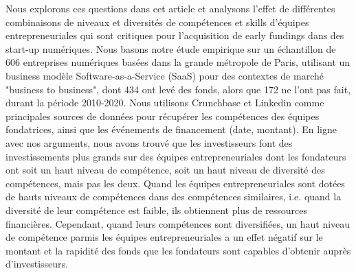 \documentclass[11pt]{article}
\begin{document}
Nous explorons ces questions dans cet article et analysons l'effet de différentes combinaisons de niveaux et diversités de compétences et skills d'équipes entrepreneuriales qui sont critiques pour l'acquisition de early fundings dans des start-up numériques. Nous basons notre étude empirique sur un échantillon de 606 entreprises numériques basées dans la grande métropole de Paris, utilisant un business modèle Software-as-a-Service (SaaS) pour des contextes de marché "business to business", dont 434 ont levé des fonds, alors que 172 ne l'ont pas fait, durant la période 2010-2020. Nous utilisons Crunchbase et Linkedin comme principales sources de données pour récupérer les compétences des équipes fondatrices, ainsi que les événements de financement (date, montant). En ligne avec nos arguments, nous avons trouvé que les investisseurs font des investissements plus grands sur des équipes entrepreneuriales dont les fondateurs ont soit un haut niveau de compétence, soit un haut niveau de diversité des compétences, mais pas les deux. Quand les équipes entrepreneuriales sont dotées de hauts niveaux de compétences dans des compétences similaires, i.e. quand la diversité de leur compétence est faible, ils obtiennent plus de ressources financières. Cependant, quand leurs compétences sont diversifiées, un haut niveau de compétence parmis les équipes entrepreneuriales a un effet négatif sur le montant et la rapidité des fonds que les fondateurs sont capables d'obtenir auprès d'investisseurs.
\end{document}
